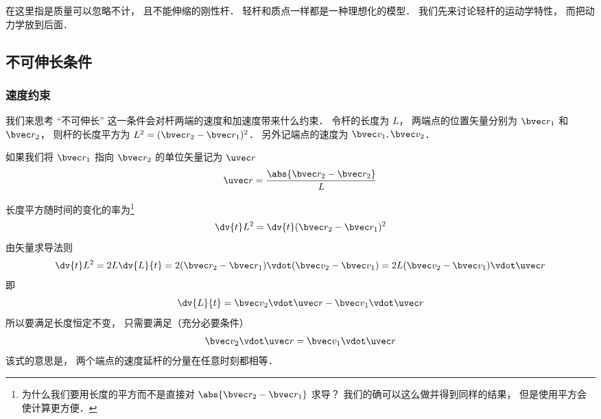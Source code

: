 

在这里指是质量可以忽略不计， 且不能伸缩的刚性杆． 轻杆和质点一样都是一种理想化的模型． 我们先来讨论轻杆的运动学特性， 而把动力学放到后面．

\subsection{不可伸长条件}
\subsubsection{速度约束}
我们来思考 “不可伸长” 这一条件会对杆两端的速度和加速度带来什么约束． 令杆的长度为 $L$， 两端点的位置矢量分别为 $\bvec r_1$ 和 $\bvec r_2$， 则杆的长度平方为 $L^2 = (\bvec r_2 - \bvec r_1)^2$． 另外记端点的速度为 $\bvec v_1, \bvec v_2$．

如果我们将 $\bvec r_1$ 指向 $\bvec r_2$ 的单位矢量记为 $\uvec r$
\begin{equation}
\uvec r = \frac{\abs{\bvec r_2 - \bvec r_2}}{L}
\end{equation}

长度平方随时间的变化的率为\footnote{为什么我们要用长度的平方而不是直接对 $\abs{\bvec r_2 - \bvec r_1}$ 求导？ 我们的确可以这么做并得到同样的结果， 但是使用平方会使计算更方便．}
\begin{equation}\label{rod_eq2}
\dv{t} L^2 = \dv{t} (\bvec r_2 - \bvec r_1)^2
\end{equation}
由矢量求导法则
\begin{equation}\label{rod_eq1}
\dv{t} L^2 = 2L \dv{L}{t} = 2 (\bvec r_2 - \bvec r_1) \vdot (\bvec v_2 - \bvec v_1) = 2L (\bvec v_2 - \bvec v_1) \vdot \uvec r
\end{equation}
即
\begin{equation}\label{rod_eq6}
\dv{L}{t} = \bvec v_2 \vdot \uvec r - \bvec v_1 \vdot \uvec r
\end{equation}
所以要满足长度恒定不变， 只需要满足（充分必要条件）
\begin{equation}\label{rod_eq3}
\bvec v_2 \vdot \uvec r = \bvec v_1 \vdot \uvec r
\end{equation}
该式的意思是， 两个端点的速度延杆的分量在任意时刻都相等．

